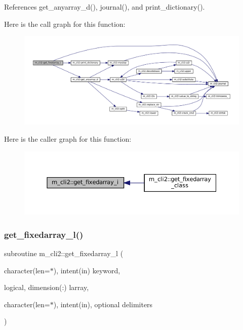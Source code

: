 References get\+\_\+anyarray\+\_\+d(), journal(), and print\+\_\+dictionary().

Here is the call graph for this function\+:
\nopagebreak
\begin{figure}[H]
\begin{center}
\leavevmode
\includegraphics[width=350pt]{namespacem__cli2_aa469ba94e6bb122c9bf30dd8642b693b_cgraph}
\end{center}
\end{figure}
Here is the caller graph for this function\+:
\nopagebreak
\begin{figure}[H]
\begin{center}
\leavevmode
\includegraphics[width=350pt]{namespacem__cli2_aa469ba94e6bb122c9bf30dd8642b693b_icgraph}
\end{center}
\end{figure}
\mbox{\label{namespacem__cli2_a65ffe8c7a444db5db3be3f6edecef008}} 
\subsubsection{\texorpdfstring{get\+\_\+fixedarray\+\_\+l()}{get\_fixedarray\_l()}}
{\footnotesize\ttfamily subroutine m\+\_\+cli2\+::get\+\_\+fixedarray\+\_\+l (\begin{DoxyParamCaption}\item[{character(len=$\ast$), intent(in)}]{keyword,  }\item[{logical, dimension(\+:)}]{larray,  }\item[{character(len=$\ast$), intent(in), optional}]{delimiters }\end{DoxyParamCaption})\hspace{0.3cm}{\ttfamily [private]}}



